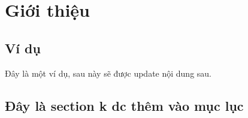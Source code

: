 \chapter{Giới thiệu}
\section{Ví dụ}

\noindent Đây là một ví dụ, sau này sẽ được update nội dung sau.

\section*{Đây là section k dc thêm vào mục lục}